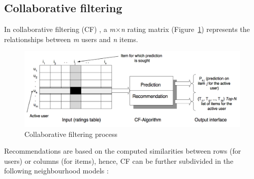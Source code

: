 \subsection{Collaborative filtering}
In collaborative filtering (CF) \parencite{Yao2015453}, a \emph{m$\times$n} rating matrix (Figure~\ref{fig:useritemmatrix}) represents the relationships between \textit{m} users and \textit{n} items.
\begin{figure}[ht!]
	\centering
	\includegraphics[width=\textwidth]{chapter2/user_item_data.png}
	\caption{Collaborative filtering process \parencite{sarwar2001item}}
	\label{fig:useritemmatrix}
\end{figure}

Recommendations are based on the computed similarities between rows (for users) or columns (for items), hence, CF can be further subdivided in the following neighbourhood models \parencite{Hu2008263}:

